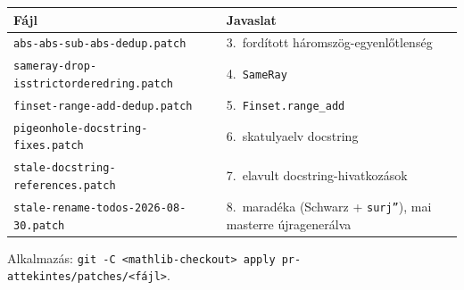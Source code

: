 \documentclass[11pt,a4paper]{article}
\newcommand{\lean}[1]{\texttt{\small #1}}
\newcommand{\bk}{\allowbreak}
\begin{document}
\begin{center}
\footnotesize
\begin{tabular}{@{}ll@{}}
\toprule
\textbf{Fájl} & \textbf{Javaslat}\\
\midrule
\lean{abs-abs-sub-abs-dedup.\bk patch} & 3.\ fordított háromszög-egyenlőtlenség\\
\lean{sameray-drop-isstrictorderedring.\bk patch} & 4.\ \lean{SameRay}\\
\lean{finset-range-add-dedup.\bk patch} & 5.\ \lean{Finset.\bk range\_\bk add}\\
\lean{pigeonhole-docstring-fixes.\bk patch} & 6.\ skatulyaelv docstring\\
\lean{stale-docstring-references.\bk patch} & 7.\ elavult docstring-hivatkozások\\
\lean{stale-rename-todos-2026-08-30.\bk patch} & 8.\ maradéka (Schwarz + \lean{surj''}), mai masterre újragenerálva\\
\bottomrule
\end{tabular}
\end{center}

\noindent
Alkalmazás:
\lean{git -C <mathlib-checkout> apply pr-attekintes/\bk patches/\bk <fájl>}.
\end{document}

